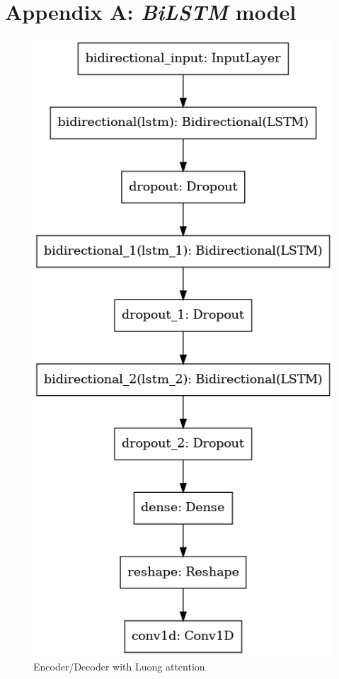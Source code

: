 \documentclass[10.5pt,a4paper,twocolumn]{article}
\begin{document}
\section*{Appendix A: \textit{BiLSTM} model}
\begin{figure}[h]
    \centering
    \includegraphics[width=0.8\linewidth]{pics/bilstm_model.png}
    \caption{Encoder/Decoder with Luong attention}
\end{figure}
\vfill\break
\end{document}
